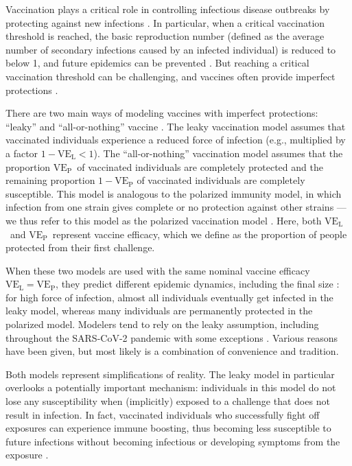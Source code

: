 \documentclass[12pt]{article}
\newcommand{\VE}{\ensuremath{\mathrm{VE}}}
\newcommand{\VEP}{\ensuremath{\VE_{\mathrm{P}}}}
\newcommand{\VEL}{\ensuremath{\VE_{\mathrm{L}}}}
\begin{document}
Vaccination plays a critical role in controlling infectious disease outbreaks by protecting against new infections \citep{iwasaki2020and}.
In particular, when a critical vaccination threshold is reached, the basic reproduction number (defined as the average number of secondary infections caused by an infected individual) is reduced to below 1, and future epidemics can be prevented \citep{anderson1985vaccination}.
But reaching a critical vaccination threshold can be challenging, and vaccines often provide imperfect protections \citep{gandon2003imperfect,anderson2020challenges}.

There are two main ways of modeling vaccines with imperfect protections: ``leaky'' and ``all-or-nothing'' vaccine \citep{smith1984assessment}.
The leaky vaccination model assumes that vaccinated individuals experience a reduced force of infection (e.g., multiplied by a factor $1-\VEL < 1$).
The ``all-or-nothing'' vaccination model assumes that the proportion \VEP\ of vaccinated individuals are completely protected and the remaining proportion $1-\VEP$ of vaccinated individuals are completely susceptible.
This model is analogous to the polarized immunity model, in which infection from one strain gives complete or no protection against other strains \citep{gog2002dynamics}---we thus refer to this model as the polarized vaccination model \citep{gomes2014missing}.
Here, both \VEL\ and \VEP\ represent vaccine efficacy, which we define as the proportion of people protected from their first challenge.

When these two models are used with the same nominal vaccine efficacy $\VEL = \VEP$, they predict different epidemic dynamics, including the final size \citep{smith1984assessment}:
for high force of infection, almost all individuals eventually get infected in the leaky model, whereas many individuals are permanently protected in the polarized model.
Modelers tend to rely on the leaky assumption, including throughout the SARS-CoV-2 pandemic \citep{dyson2021possible,gozzi2021importance,marziano2021vaccine,matrajt2021vaccine,park2022intermediate} with some exceptions \citep{bubar2021model,buckner2021dynamic}.
Various reasons have been given, but most likely is a combination of convenience and tradition.

Both models represent simplifications of reality.
The leaky model in particular overlooks a potentially important mechanism: individuals in this model do not lose any susceptibility when (implicitly) exposed to a challenge that does not result in infection. 
In fact, vaccinated individuals who successfully fight off exposures can experience immune boosting, thus becoming less susceptible to future infections without becoming infectious or developing symptoms from the exposure \citep{lavine2011natural,yang2020waning}.
\end{document}
